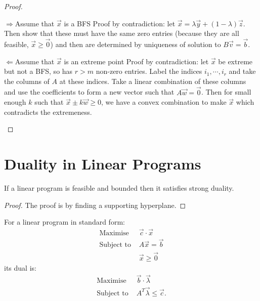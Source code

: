\documentclass[../Main.tex]{subfiles}
\begin{document}
\begin{proof}
    \begin{proofdirection}{$\Rightarrow$}{Assume that $\vec{x}$ is a BFS}
        Proof by contradiction: let $\vec{x} = \lambda \vec{y} + (1-\lambda)\vec{z}$. Then show that these must have the same zero entries (because they are all feasible, $\vec{x} \geq \vec0$) and then are determined by uniqueness of solution to $B\vec{v} = \vec{b}$.
    \end{proofdirection}
    \begin{proofdirection}{$\Leftarrow$}{Assume that $\vec{x}$ is an extreme point}
        Proof by contradiction: let $\vec{x}$ be extreme but not a BFS, so has $r > m$ non-zero entries. Label the indices $i_1, \cdots, i_r$ and take the columns of $A$ at these indices. Take a linear combination of these columns and use the coefficients to form a new vector such that $A \vec{w} = \vec{0}$. Then for small enough $k$ such that $\vec{x} \pm k\vec{w} \geq 0$, we have a convex combination to make $\vec{x}$ which contradicts the extremeness.
    \end{proofdirection}
\end{proof}
\section{Duality in Linear Programs}
\begin{theorem}
    If a linear program is feasible and bounded then it satisfies strong duality.
    \label{thmLinearProgStrongDual}
\end{theorem}
\begin{proof}
    The proof is by finding a supporting hyperplane.
\end{proof}
For a linear program in standard form:
\begin{align*}
    \text{Maximise } & \vec{c} \cdot \vec{x} \\
    \text{Subject to } & A\vec{x} = \vec{b} \\
    & \vec{x} \geq \vec{0}
\end{align*}
its dual is:
\begin{align*}
    \text{Maximise } & \vec{b} \cdot \vec{\lambda} \\
    \text{Subject to } & A^T\vec{\lambda} \leq \vec{c}.
\end{align*}
\end{document}
